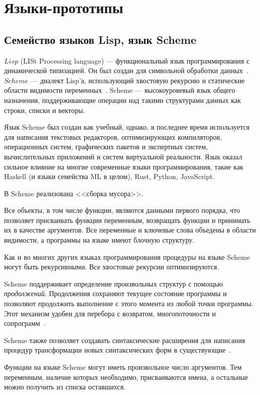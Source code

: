 \section{Языки-прототипы}
    \subsection{Семейство языков Lisp, язык Scheme}
        $Lisp$ (LISt Processing language) --- функциональный язык программирования с динамической типизацией. 
        Он был создан для символьной обработки данных~\cite{p_c_lisp}.
        $Scheme$ --- диалект Lisp'а, использующий хвостовую рекурсию и статические области видимости переменных~\cite{scheme_doc}.
        Scheme --- высокоуровевый язык общего назначения, поддерживающие операции над такими структурами данных как строки, списки и векторы.

        Язык Scheme был создан как учебный, однако, в последнее время используется для написания текстовых редакторов, оптимизирующих компиляторов, операционных систем, графических пакетов и экспертных систем, вычислительных приложений и систем виртуальной реальности.
        Язык оказал сильное влияние на многие современные языки программирования, такие как Haskell (и языки семейства ML в целом), Rust, Python, JavaScript.

        В Scheme реализована <<сборка мусора>>.
        
        Все объекты, в том числе функции, являются данными первого порядка, что позволяет присваивать функции переменным, возвращать функции и принимать их в качестве аргументов.
        Все переменные и ключевые слова объедены в области видимости, а программы на языке имеют блочную структуру.
        
        Как и во многих других языках программирования процедуры на языке Scheme могут быть рекурсивными.
        Все хвостовые рекурсии оптимизируются.

        Scheme поддерживает определение произвольных структур с помощью \textit{продолжений}.
        Продолжения сохраняют текущее состояние программы и позволяют продолжить выполнение с этого момента из любой точки программы.
        Этот механизм удобен для перебора с возвратом, многопоточности и сопрограмм~\cite{scheme_pl}.

        Scheme также позволяет создавать синтаксические расширения для написания процедур трансформации новых синтаксических форм в существующие~\cite{scheme_pl}.

        Функции на языке Scheme могут иметь произвольное число аргументов.
        Тем переменным, наличие которых необходимо, присваиваются имена, а остальные можно получить из списка оставшихся.

